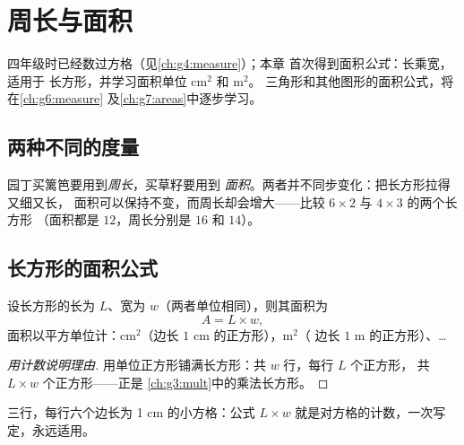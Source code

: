 \chapter{周长与面积}\label{ch:g5:areas}

四年级时已经数过方格（见\cref{ch:g4:measure}）；本章
首次得到面积\emph{公式}：长乘宽，适用于
长方形，并学习面积单位 cm$^2$ 和 m$^2$。
三角形和其他图形的面积公式，将在\cref{ch:g6:measure}
及\cref{ch:g7:areas}中逐步学习。

\section{两种不同的度量}

\begin{example}[周长与面积]\label{ex:g5:areas:contrast}
园丁买篱笆要用到\emph{周长}，买草籽要用到
\emph{面积}。两者并不同步变化：把长方形拉得又细又长，
面积可以保持不变，而周长却会增大——比较
$6 \times 2$ 与 $4 \times 3$ 的两个长方形
（面积都是 $12$，周长分别是 $16$ 和 $14$）。
\end{example}

\section{长方形的面积公式}

\begin{proposition}[长方形的面积]\label{prop:g5:areas:rectangle}
设长方形的长为 $L$、宽为 $w$（两者单位相同），则其面积为
\[
A = L \times w ,
\]
面积以平方单位计：cm$^2$（边长 $1$ cm 的正方形），m$^2$（
边长 $1$ m 的正方形）、\dots
\end{proposition}

\begin{proof}[用计数说明理由]
用单位正方形铺满长方形：共 $w$ 行，每行 $L$ 个正方形，
共 $L \times w$ 个正方形——正是
\cref{ch:g3:mult}中的乘法长方形。
\end{proof}

\begin{omfigure}

{\small 三行，每行六个边长为 1 cm 的小方格：公式
$L \times w$ 就是对方格的计数，一次写定，永远适用。}
\end{omfigure}

